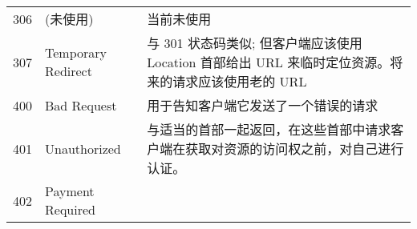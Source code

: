 \begin{longtable}[]{@{}cll@{}}
\begin{minipage}[t]{0.32\columnwidth}\centering\strut
306\strut
\end{minipage} & \begin{minipage}[t]{0.30\columnwidth}\raggedright\strut
(未使用)\strut
\end{minipage} & \begin{minipage}[t]{0.30\columnwidth}\raggedright\strut
当前未使用\strut
\end{minipage}\tabularnewline
\begin{minipage}[t]{0.32\columnwidth}\centering\strut
307\strut
\end{minipage} & \begin{minipage}[t]{0.30\columnwidth}\raggedright\strut
Temporary Redirect\strut
\end{minipage} & \begin{minipage}[t]{0.30\columnwidth}\raggedright\strut
与 301 状态码类似; 但客户端应该使用 Location 首部给出 URL
来临时定位资源。将来的请求应该使用老的 URL\strut
\end{minipage}\tabularnewline
\begin{minipage}[t]{0.32\columnwidth}\centering\strut
400\strut
\end{minipage} & \begin{minipage}[t]{0.30\columnwidth}\raggedright\strut
Bad Request\strut
\end{minipage} & \begin{minipage}[t]{0.30\columnwidth}\raggedright\strut
用于告知客户端它发送了一个错误的请求\strut
\end{minipage}\tabularnewline
\begin{minipage}[t]{0.32\columnwidth}\centering\strut
401\strut
\end{minipage} & \begin{minipage}[t]{0.30\columnwidth}\raggedright\strut
Unauthorized\strut
\end{minipage} & \begin{minipage}[t]{0.30\columnwidth}\raggedright\strut
与适当的首部一起返回，在这些首部中请求客户端在获取对资源的访问权之前，对自己进行认证。\strut
\end{minipage}\tabularnewline
\begin{minipage}[t]{0.32\columnwidth}\centering\strut
402\strut
\end{minipage} & \begin{minipage}[t]{0.30\columnwidth}\raggedright\strut
Payment Required\strut
\end{minipage} & \begin{minipage}[t]{0.30\columnwidth}\raggedright\strut

\end{minipage}
\end{longtable}
